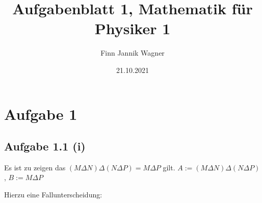 \documentclass{article}
\date{21.10.2021}
\title{Aufgabenblatt 1, Mathematik für Physiker 1}
\author{Finn Jannik Wagner}
\begin{document}
    \maketitle
    
    \section*{Aufgabe 1}

        \subsection*{Aufgabe 1.1 (i)}

        Es ist zu zeigen das \((M \Delta N) \Delta (N\Delta P) = M \Delta P\) gilt.
        \(A := (M \Delta N) \Delta (N\Delta P)\), \(B := M \Delta P\)

        Hierzu eine Fallunterscheidung:
\end{document}
